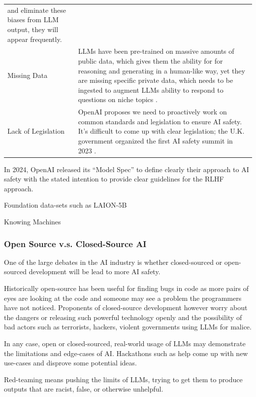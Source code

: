 \documentclass[
  letterpaper,
  DIV=11,
  numbers=noendperiod]{scrartcl}
\begin{document}
\begin{longtable}[]{@{}
  >{\raggedright\arraybackslash}p{}
  >{\raggedright\arraybackslash}p{}@{}}
and eliminate these biases from LLM output, they will appear
frequently. \\
Missing Data & LLMs have been pre-trained on massive amounts of public
data, which gives them the ability for for reasoning and generating in a
human-like way, yet they are missing specific private data, which needs
to be ingested to augment LLMs ability to respond to questions on niche
topics \citep{Liu_LlamaIndex_2022}. \\
Lack of Legislation & \citet{anderljungFrontierAIRegulation2023} OpenAI
proposes we need to proactively work on common standards and legislation
to ensure AI safety. It's difficult to come up with clear legislation;
the U.K. government organized the first AI safety summit in 2023
\citet{browneBritainHostWorld2023}. \\
\end{longtable}

In 2024, OpenAI released its ``Model Spec'' to define clearly their
approach to AI safety with the stated intention to provide clear
guidelines for the RLHF approach. \citet{openaiIntroducingModelSpec2024}

Foundation data-sets such as LAION-5B
\citep{romainbeaumontLAION5BNEWERA2022, schuhmannLAION5BOpenLargescale2022}

Knowing Machines

\subsubsection{Open Source v.s. Closed-Source
AI}\label{open-source-v.s.-closed-source-ai}

One of the large debates in the AI industry is whether closed-sourced or
open-sourced development will be lead to more AI safety.

Historically open-source has been useful for finding bugs in code as
more pairs of eyes are looking at the code and someone may see a problem
the programmers have not noticed. Proponents of closed-source
development however worry about the dangers or releasing such powerful
technology openly and the possibility of bad actors such as terrorists,
hackers, violent governments using LLMs for malice.

In any case, open or closed-sourced, real-world usage of LLMs may
demonstrate the limitations and edge-cases of AI. Hackathons such as
\citet{peteWeHostedEmergencychatgpthackathon2023} help come up with new
use-cases and disprove some potential ideas.

Red-teaming means pushing the limits of LLMs, trying to get them to
produce outputs that are racist, false, or otherwise unhelpful.
\end{document}
